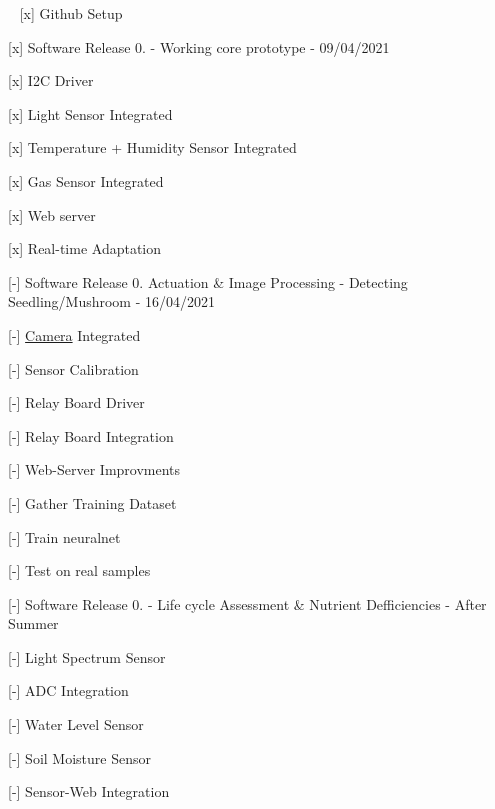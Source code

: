~\newline
 \mbox{[}x\mbox{]} Github Setup

\mbox{[}x\mbox{]} Software Release 0. -\/ Working core prototype -\/ 09/04/2021
\begin{DoxyItemize}
\item \mbox{[}x\mbox{]} I2C Driver
\item \mbox{[}x\mbox{]} Light Sensor Integrated
\item \mbox{[}x\mbox{]} Temperature + Humidity Sensor Integrated
\item \mbox{[}x\mbox{]} Gas Sensor Integrated
\item \mbox{[}x\mbox{]} Web server
\item \mbox{[}x\mbox{]} Real-\/time Adaptation
\end{DoxyItemize}

\mbox{[}-\/\mbox{]} Software Release 0. Actuation \& Image Processing -\/ Detecting Seedling/\+Mushroom -\/ 16/04/2021
\begin{DoxyItemize}
\item \mbox{[}-\/\mbox{]} \hyperlink{classCamera}{Camera} Integrated
\item \mbox{[}-\/\mbox{]} Sensor Calibration
\item \mbox{[}-\/\mbox{]} Relay Board Driver
\item \mbox{[}-\/\mbox{]} Relay Board Integration
\item \mbox{[}-\/\mbox{]} Web-\/\+Server Improvments
\item \mbox{[}-\/\mbox{]} Gather Training Dataset
\item \mbox{[}-\/\mbox{]} Train neuralnet
\item \mbox{[}-\/\mbox{]} Test on real samples
\end{DoxyItemize}

\mbox{[}-\/\mbox{]} Software Release 0. -\/ Life cycle Assessment \& Nutrient Defficiencies -\/ After Summer
\begin{DoxyItemize}
\item \mbox{[}-\/\mbox{]} Light Spectrum Sensor
\item \mbox{[}-\/\mbox{]} A\+DC Integration
\item \mbox{[}-\/\mbox{]} Water Level Sensor
\item \mbox{[}-\/\mbox{]} Soil Moisture Sensor
\item \mbox{[}-\/\mbox{]} Sensor-\/\+Web Integration ~\newline
 
\end{DoxyItemize}